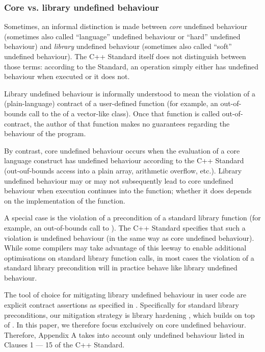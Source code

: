 \subsubsection{Core vs. library undefined behaviour}

Sometimes, an informal distinction is made between \emph{core} undefined behaviour (sometimes also called ``language'' undefined behaviour or ``hard'' undefined behaviour) and \emph{library} undefined behaviour (sometimes also called ``soft'' undefined behaviour). The C++ Standard itself does not distinguish between those terms: according to the Standard, an operation simply either has undefined behaviour when executed or it does not.

Library undefined behaviour is informally understood to mean the violation of a (plain-language) contract of a user-defined function (for example, an out-of-bounds call to the  of a vector-like class). Once that function is called out-of-contract, the author of that function makes no guarantees regarding the behaviour of the program. 

By contrast, core undefined behaviour occurs when the evaluation of a core language construct has undefined behaviour according to the C++ Standard (out-ouf-bounds access into a plain array, arithmetic overflow, etc.). Library undefined behaviour may or may not subsequently lead to core undefined behaviour when execution continues into the function; whether it does depends on the implementation of the function.

A special case is the violation of a precondition of a standard library function (for example, an out-of-bounds call to \mbox{}). The C++ Standard specifies that such a violation is undefined behaviour (in the same way as core undefined behaviour). While some compilers may take advantage of this leeway to enable additional optimisations on standard library function calls, in most cases the violation of a standard library precondition will in practice behave like library undefined behaviour.

The tool of choice for mitigating library undefined behaviour in user code are explicit contract assertions as specified in \cite{P2900R14}. Specifically for standard library preconditions, our mitigation strategy is library hardening \cite{P3471R4}, which builds on top of \cite{P2900R14}. In this paper, we therefore focus exclusively on core undefined behaviour. Therefore, Appendix A takes into account only undefined behaviour listed in Clauses 1 --- 15 of the C++ Standard.
  
